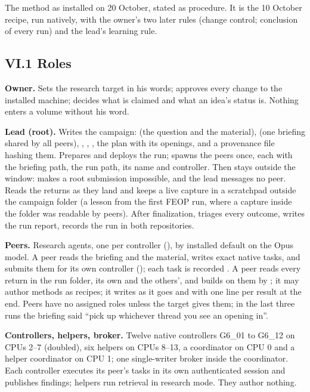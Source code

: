 \label{the-refined-duck-method-2.3.1}

The method as installed on 20 October, stated as procedure. It is the 10 October recipe, run natively, with the owner's two later rules
(change control; conclusion of every run) and the lead's learning rule.

\subsection{VI.1 Roles}\label{vi.1-roles}

\textbf{Owner.} Sets the research target in his words; approves every change to the installed machine; decides what is claimed and what an idea's
status is. Nothing enters a volume without his word.

\textbf{Lead (root).} Writes the campaign:  (the question and the material),  (one briefing shared by all peers),
, , , the plan with its openings, and a provenance file hashing them. Prepares
and deploys the run; spawns the peers once, each with the briefing path, the run path, its name and controller. Then stays outside the window:
 makes a root submission impossible, and the lead messages no peer. Reads the returns as they land and keeps a live
capture in a scratchpad outside the campaign folder (a lesson from the first FEOP run, where a capture inside the folder was readable by
peers). After finalization, triages every outcome, writes the run report, records the run in both repositories.

\textbf{Peers.} Research agents, one per controller (), by installed default on the Opus model. A peer reads the
briefing and the material, writes exact native tasks, and submits them for its own controller
(); each task is recorded . A peer reads every return in the run
folder, its own and the others', and builds on them by ; it may author methods as recipes; it writes  as it goes and
 with one line per result at the end. Peers have no assigned roles unless the target gives them; in the last three runs the
briefing said ``pick up whichever thread you see an opening in''.

\textbf{Controllers, helpers, broker.} Twelve native controllers G6\_01 to G6\_12 on CPUs 2--7 (doubled), six helpers on CPUs 8--13, a coordinator on CPU 0
and a helper coordinator on CPU 1; one single-writer broker inside the coordinator. Each controller executes its peer's tasks in its own
authenticated session and publishes findings; helpers run retrieval in research mode. They author nothing.

